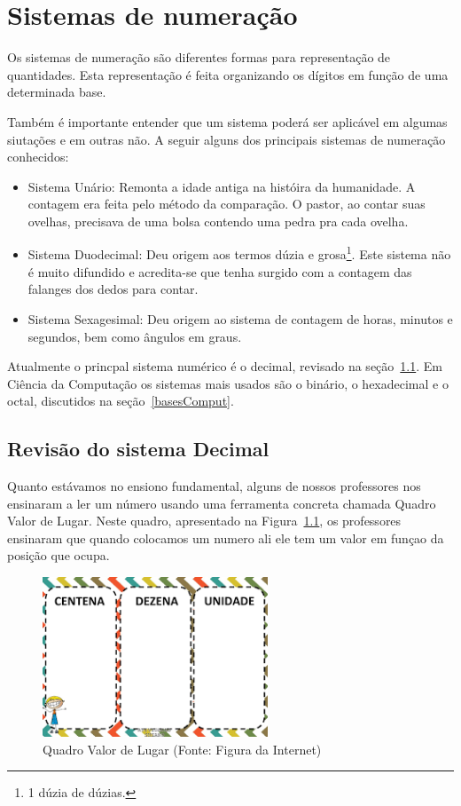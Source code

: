 \chapter{Sistemas de numeração}
\label{sinais}

Os sistemas de numeração são diferentes formas para representação de quantidades. Esta representação é feita organizando os dígitos em função de uma determinada base. 

Também é importante entender que um sistema poderá ser aplicável em algumas siutações e em outras não. A seguir alguns dos principais sistemas de numeração conhecidos:

\begin{itemize}
	\item Sistema Unário: Remonta a idade antiga na históira da humanidade. A contagem era feita pelo método da comparação. O pastor, ao contar suas ovelhas, precisava de uma bolsa contendo uma pedra pra cada ovelha. 
	\item Sistema Duodecimal: Deu origem aos termos dúzia e grosa\footnote{1 dúzia de dúzias.}. Este sistema não é muito difundido e acredita-se que tenha surgido com a contagem das falanges dos dedos para contar. 
	\item Sistema Sexagesimal: Deu origem ao sistema de contagem de horas, minutos e segundos, bem como ângulos em graus.
\end{itemize}

Atualmente o princpal sistema numérico é o decimal, revisado na seção~\ref{sistemaDecimal}. Em Ciência da Computação os sistemas mais usados são o binário, o hexadecimal e o octal, discutidos na seção~\ref{basesComput}.

\section{Revisão do sistema Decimal}
\label{sistemaDecimal}

Quanto estávamos no ensiono fundamental, alguns de nossos professores nos ensinaram a ler um número usando uma ferramenta concreta chamada Quadro Valor de Lugar. Neste quadro, apresentado na Figura~\ref{fig:qvl}, os professores ensinaram que quando colocamos um numero ali ele tem um valor em funçao da posição que ocupa. 

\begin{figure}[h]
	\begin{center}
		\includegraphics[width=0.6\textwidth]{img/sistemasNum/qvl.png}
		\caption{Quadro Valor de Lugar (Fonte: Figura da Internet)}
		\label{fig:qvl}
	\end{center}
\end{figure}

